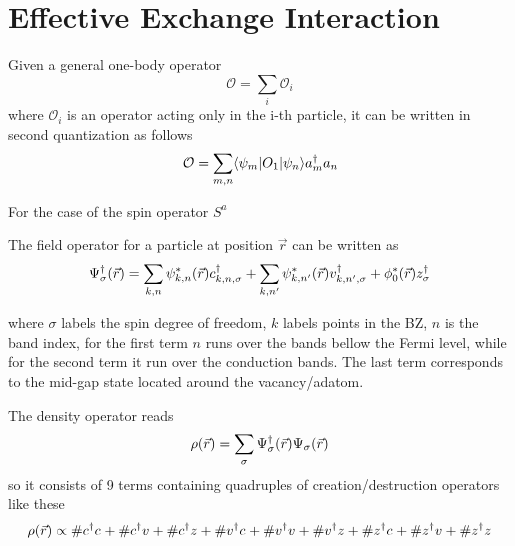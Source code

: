 \chapter{Effective Exchange Interaction}
Given a general one-body operator
\begin{equation}
  \mathcal{O} = \sum_i\mathcal{O}_i
\end{equation}
where $\mathcal{O}_i$ is an operator acting only in the i-th particle, it can be written in second quantization as follows
\begin{equation}
  \mathcal{O} = \sum_{m,n}\langle\psi_m|O_1|\psi_n\rangle a^{\dagger}_{m}a_{n}
\end{equation}

For the case of the spin operator $S^a$

The field operator for a particle at position $\vec{r}$ can be written as
\begin{equation}
  \Psi^{\dagger}_{\sigma}(\vec{r}) =
  \sum_{k,n}\psi^*_{k,n}(\vec{r})c^{\dagger}_{k,n,\sigma} +
  \sum_{k,n'}\psi^*_{k,n'}(\vec{r})v^{\dagger}_{k,n',\sigma} +
  \phi^*_0(\vec{r})z^{\dagger}_{\sigma}
\end{equation}

where $\sigma$ labels the spin degree of freedom, $k$ labels points in the BZ, $n$ is the band index, for the first term $n$ runs over the bands bellow the Fermi level, while for the second term it run over the conduction bands.
The last term corresponds to the mid-gap state located around the vacancy/adatom.

The density operator reads
\begin{equation}
  \rho(\vec{r})=\sum_\sigma\Psi^{\dagger}_{\sigma}(\vec{r})\Psi_{\sigma}(\vec{r})
\end{equation}
so it consists of 9 terms containing quadruples of creation/destruction operators like these
\begin{equation*}
  \rho(\vec{r}) \propto
  \#c^{\dagger}_{}c_{} + \#c^{\dagger}_{}v_{} + \#c^{\dagger}_{}z_{} +
  \#v^{\dagger}_{}c_{} + \#v^{\dagger}_{}v_{} + \#v^{\dagger}_{}z_{} +
  \#z^{\dagger}_{}c_{} + \#z^{\dagger}_{}v_{} + \#z^{\dagger}_{}z_{}
\end{equation*}

